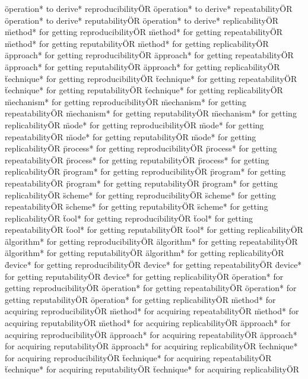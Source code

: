 \documentclass[
10pt, %
a4paper, %
oneside, %
headinclude,footinclude, %
BCOR5mm, %
]{scrartcl}
\begin{document}
\"operation* to derive* reproducibility\" OR \"operation* to derive* repeatability\" OR \"operation* to derive* reputability\" OR \"operation* to derive* replicability\" OR 
\"method* for getting reproducibility\" OR \"method* for getting repeatability\" OR \"method* for getting reputability\" OR \"method* for getting replicability\" OR 
\"approach* for getting reproducibility\" OR \"approach* for getting repeatability\" OR \"approach* for getting reputability\" OR \"approach* for getting replicability\" OR 
\"technique* for getting reproducibility\" OR \"technique* for getting repeatability\" OR \"technique* for getting reputability\" OR \"technique* for getting replicability\" OR 
\"mechanism* for getting reproducibility\" OR \"mechanism* for getting repeatability\" OR \"mechanism* for getting reputability\" OR \"mechanism* for getting replicability\" OR 
\"mode* for getting reproducibility\" OR \"mode* for getting repeatability\" OR \"mode* for getting reputability\" OR \"mode* for getting replicability\" OR 
\"process* for getting reproducibility\" OR \"process* for getting repeatability\" OR \"process* for getting reputability\" OR \"process* for getting replicability\" OR 
\"program* for getting reproducibility\" OR \"program* for getting repeatability\" OR \"program* for getting reputability\" OR \"program* for getting replicability\" OR 
\"scheme* for getting reproducibility\" OR \"scheme* for getting repeatability\" OR \"scheme* for getting reputability\" OR \"scheme* for getting replicability\" OR 
\"tool* for getting reproducibility\" OR \"tool* for getting repeatability\" OR \"tool* for getting reputability\" OR \"tool* for getting replicability\" OR 
\"algorithm* for getting reproducibility\" OR \"algorithm* for getting repeatability\" OR \"algorithm* for getting reputability\" OR \"algorithm* for getting replicability\" OR 
\"device* for getting reproducibility\" OR \"device* for getting repeatability\" OR \"device* for getting reputability\" OR \"device* for getting replicability\" OR 
\"operation* for getting reproducibility\" OR \"operation* for getting repeatability\" OR \"operation* for getting reputability\" OR \"operation* for getting replicability\" OR 
\"method* for acquiring reproducibility\" OR \"method* for acquiring repeatability\" OR \"method* for acquiring reputability\" OR \"method* for acquiring replicability\" OR 
\"approach* for acquiring reproducibility\" OR \"approach* for acquiring repeatability\" OR \"approach* for acquiring reputability\" OR \"approach* for acquiring replicability\" OR 
\"technique* for acquiring reproducibility\" OR \"technique* for acquiring repeatability\" OR \"technique* for acquiring reputability\" OR \"technique* for acquiring replicability\" OR 
\end{document}
